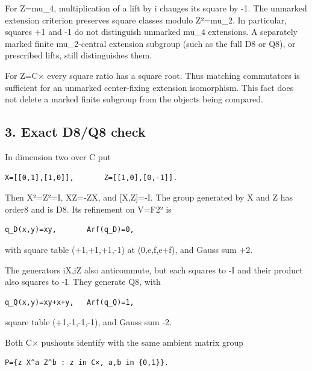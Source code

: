 For Z=mu\_4, multiplication of a lift by i changes its square by -1. The
unmarked extension criterion preserves square classes modulo Z²=mu\_2.
In particular, squares +1 and -1 do not distinguish unmarked mu\_4
extensions. A separately marked finite mu\_2-central extension subgroup
(such as the full D8 or Q8), or prescribed lifts, still distinguishes
them.

For Z=C× every square ratio has a square root. Thus matching commutators
is sufficient for an unmarked center-fixing extension isomorphism. This
fact does not delete a marked finite subgroup from the objects being
compared.

\hypertarget{dyadic_markings-exact-d8q8-check}{%
\subsection{3. Exact D8/Q8 check}\label{dyadic_markings-exact-d8q8-check}}

In dimension two over C put

\begin{Verbatim}[fontsize=\small,breaklines=true,breakanywhere=true]
X=[[0,1],[1,0]],       Z=[[1,0],[0,-1]].
\end{Verbatim}

Then X²=Z²=I, XZ=-ZX, and {[}X,Z{]}=-I. The group generated by X and Z
has order8 and is D8. Its refinement on V=F2² is

\begin{Verbatim}[fontsize=\small,breaklines=true,breakanywhere=true]
q_D(x,y)=xy,       Arf(q_D)=0,
\end{Verbatim}

with square table (+1,+1,+1,-1) at (0,e,f,e+f), and Gauss sum +2.

The generators iX,iZ also anticommute, but each squares to -I and their
product also squares to -I. They generate Q8, with

\begin{Verbatim}[fontsize=\small,breaklines=true,breakanywhere=true]
q_Q(x,y)=xy+x+y,   Arf(q_Q)=1,
\end{Verbatim}

square table (+1,-1,-1,-1), and Gauss sum -2.

Both C× pushouts identify with the same ambient matrix group

\begin{Verbatim}[fontsize=\small,breaklines=true,breakanywhere=true]
P={z X^a Z^b : z in C×, a,b in {0,1}}.
\end{Verbatim}

